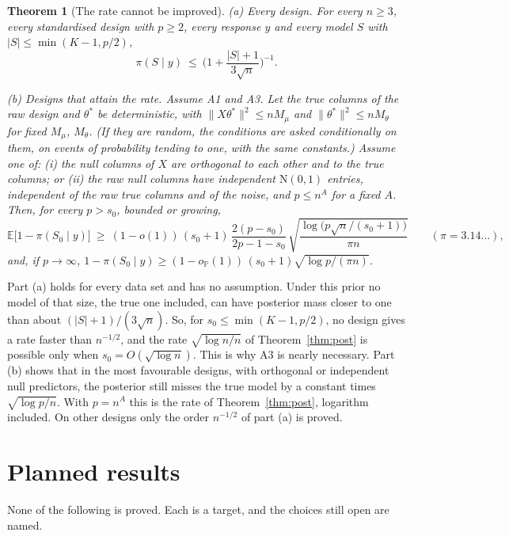 \documentclass[11pt]{article}
\renewcommand{\P}{\mathbb{P}}
\newcommand{\E}{\mathbb{E}}
\newcommand{\N}{\mathrm{N}}
\newcommand{\abs}[1]{\lvert #1\rvert}
\newcommand{\norm}[1]{\lVert #1\rVert}
\newcommand{\tstar}{\theta^*}
\newcommand{\Sz}{S_0}
\newcommand{\sz}{s_0}
\newcommand{\pis}[1]{\pi(#1\mid y)}
\newcommand{\rn}{\sqrt{\log n/n}}
\newcommand{\oP}{o_{\P}}
\theoremstyle{plain}
\newtheorem{thm}{Theorem}
\theoremstyle{definition}
\begin{document}
\begin{thm}[The rate cannot be improved]\label{thm:sharp}
\textup{(a)} \emph{Every design.} For every $n\ge3$, every standardised design with $p\ge2$, every response $y$ and
every model $S$ with $\abs{S}\le\min(K-1,p/2)$,
\[
  \pis{S}\ \le\ \Big(1+\frac{\abs{S}+1}{3\sqrt n}\Big)^{-1}.
\]

\textup{(b)} \emph{Designs that attain the rate.} Assume A1 and A3. Let the true columns of the raw design and $\tstar$
be deterministic, with $\norm{X\tstar}^2\le nM_\mu$ and $\norm{\tstar}^2\le nM_\theta$ for fixed $M_\mu$, $M_\theta$. (If
they are random, the conditions are asked conditionally on them, on events of probability tending to one, with the
same constants.) Assume one of: \textup{(i)} the null columns of $X$ are orthogonal to each other and to the true
columns; or \textup{(ii)} the raw null columns have independent $\N(0,1)$ entries, independent of the raw true columns
and of the noise, and $p\le n^A$ for a fixed $A$. Then, for every $p>\sz$, bounded or growing,
\[
  \E\big[1-\pis{\Sz}\big]\ \ge\ (1-o(1))\,(\sz+1)\,\frac{2(p-\sz)}{2p-1-\sz}\,
  \sqrt{\frac{\log\!\big(p\sqrt n/(\sz+1)\big)}{\pi n}}\qquad(\pi=3.14\ldots),
\]
and, if $p\to\infty$, $1-\pis{\Sz}\ge(1-\oP(1))\,(\sz+1)\sqrt{\log p/(\pi n)}$.
\end{thm}

Part (a) holds for every data set and has no assumption. Under this prior no model of that size, the true one included,
can have posterior mass closer to one than about $(\abs{S}+1)/(3\sqrt n)$. So, for $\sz\le\min(K-1,p/2)$, no design gives a rate faster than
$n^{-1/2}$, and the rate $\rn$ of Theorem~\ref{thm:post} is possible only when $\sz=O(\sqrt{\log n})$. This is why A3 is
nearly necessary. Part (b) shows that in the most favourable designs, with orthogonal or independent null predictors,
the posterior still misses the true model by a constant times $\sqrt{\log p/n}$. With $p=n^A$ this is the rate of
Theorem~\ref{thm:post}, logarithm included. On other designs only the order $n^{-1/2}$ of part (a) is proved.

\section{Planned results}\label{sec:planned}

None of the following is proved. Each is a target, and the choices still open are named.
\end{document}
